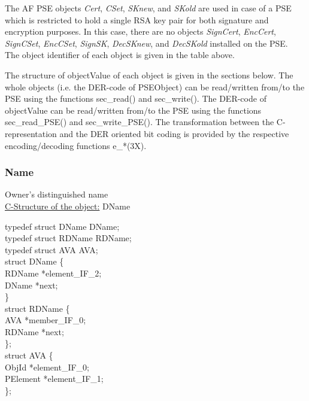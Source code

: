\ec
The AF PSE objects {\em Cert}, {\em CSet}, {\em SKnew}, and {\em SKold} are used in case
of a PSE which is restricted to hold a single RSA key pair for both signature and encryption purposes.
In this case, there are no objects {\em SignCert}, {\em EncCert}, {\em SignCSet}, {\em EncCSet}, {\em SignSK},
{\em DecSKnew}, and {\em DecSKold} installed on the PSE. \\ [1em]
The object identifier of each object is given in the table above.

The structure of objectValue of each object is given in the sections below.
The whole objects (i.e. the DER-code of PSEObject) can be read/written from/to
the PSE using the functions sec\_read() and sec\_write(). The DER-code
of objectValue can be read/written from/to the PSE using the functions
sec\_read\_PSE() and sec\_write\_PSE().
The transformation between the C-representation and the DER oriented bit coding
is provided by the respective encoding/decoding functions e\_*(3X). 

\subsubsection{Name}
Owner's distinguished name \\
\underline{C-Structure of the object:} DName

{\small
\bvtab
\2 typedef struct DName DName;                  \\
\2 typedef struct RDName RDName;                \\
\2 typedef struct AVA AVA;                      \\
\2 struct DName \{                              \\
\4        RDName       \3 *element\_IF\_2;      \\
\4        DName        \3 *next;                \\
\2 \}                                           \\ [1em]
\2 struct RDName \{                             \\
\4        AVA          \3 *member\_IF\_0;       \\
\4        RDName       \3 *next;                \\
\2 \};                                          \\ [1em]
\2 struct AVA \{                                \\ 
\4        ObjId  \3 *element\_IF\_0;            \\
\4        PElement     \3 *element\_IF\_1;      \\
\2 \};                                          \\
\evtab
}

